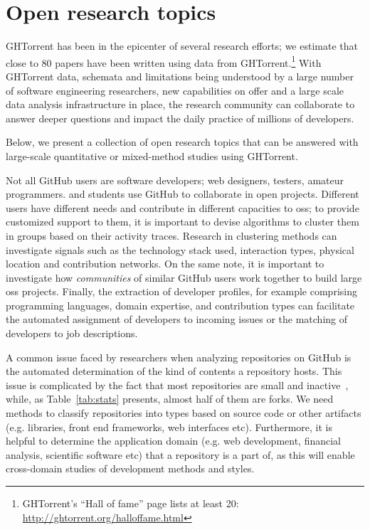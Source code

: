 \documentclass{sig-alternate}
\begin{document}
\section{Open research topics}

GHTorrent has been in the epicenter of several research
efforts; we estimate that close to 80 papers have been written using data from
GHTorrent.\footnote{GHTorrent's ``Hall of fame'' page lists at least 20:
\url{http://ghtorrent.org/halloffame.html}} With GHTorrent data, schemata and
limitations being understood by a large number of software engineering
researchers, new capabilities on offer and a large scale data analysis
infrastructure in place, the research community can collaborate to answer deeper
questions and impact the daily practice of millions of developers.

Below, we present a collection of open research topics that can be answered
with large-scale quantitative or mixed-method studies using GHTorrent.

 Not all GitHub users are software developers;
web designers, testers, amateur programmers. and students use GitHub to
collaborate in open projects. Different users have different needs and
contribute in different capacities to {\sc oss}; to provide customized support
to them, it is important to devise algorithms to cluster them in groups based on
their activity traces. Research in clustering methods can investigate signals
such as the technology stack used, interaction types, physical location and
contribution networks. On the same note, it is important to investigate how
\emph{communities} of similar GitHub users work together to build large {\sc
oss} projects. Finally, the extraction of developer profiles, for example
comprising programming languages, domain expertise, and contribution types can
facilitate the automated assignment of developers to incoming issues or the
matching of developers to job descriptions.

 A common issue faced by researchers when analyzing
repositories on GitHub is the automated determination of the kind of contents a
repository hosts. This issue is complicated by the fact that most repositories
are small and inactive~\cite{KGBSGD15}, while, as Table~\ref{tab:stats}
presents, almost half of them are forks. We need methods to classify
repositories into types based on source code or other artifacts (e.g. libraries,
front end frameworks, web interfaces etc).  Furthermore, it is helpful to
determine the application domain (e.g. web development, financial analysis,
scientific software etc) that a repository is a part of, as this will enable
cross-domain studies of development methods and styles.
\end{document}
